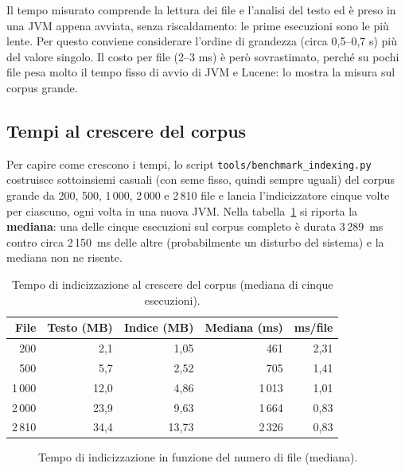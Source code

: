 \documentclass[11pt,a4paper]{article}
\newcommand{\code}[1]{\texttt{#1}}
\begin{document}
\noindent Il tempo misurato comprende la lettura dei file e l'analisi del testo
ed è preso in una JVM appena avviata, senza riscaldamento: le prime esecuzioni
sono le più lente. Per questo conviene considerare l'ordine di grandezza
(circa 0,5--0,7 s) più del valore singolo. Il costo per file (2--3 ms) è però
sovrastimato, perché su pochi file pesa molto il tempo fisso di avvio di JVM e Lucene:
lo mostra la misura sul corpus grande.

\subsection{Tempi al crescere del corpus}
\label{sec:tempi-grande}

Per capire come crescono i tempi, lo script \code{tools/benchmark\_indexing.py} costruisce
sottoinsiemi casuali (con seme fisso, quindi sempre uguali) del corpus grande da 200,
500, 1\,000, 2\,000 e 2\,810 file e lancia l'indicizzatore cinque volte per ciascuno,
ogni volta in una nuova JVM. Nella tabella~\ref{tab:scala} si riporta la
\textbf{mediana}: una delle cinque esecuzioni sul corpus completo è durata 3\,289~ms
contro circa 2\,150~ms delle altre (probabilmente un disturbo del sistema) e la
mediana non ne risente.

\begin{table}[!htbp]
\centering
\begin{tabular}{@{}rrrrr@{}}
\toprule
\textbf{File} & \textbf{Testo (MB)} & \textbf{Indice (MB)} & \textbf{Mediana (ms)} & \textbf{ms/file} \\
\midrule
200   & 2,1  & 1,05  &  461 & 2,31 \\
500   & 5,7  & 2,52  &  705 & 1,41 \\
1\,000 & 12,0 & 4,86  & 1\,013 & 1,01 \\
2\,000 & 23,9 & 9,63  & 1\,664 & 0,83 \\
2\,810 & 34,4 & 13,73 & 2\,326 & 0,83 \\
\bottomrule
\end{tabular}
\caption{Tempo di indicizzazione al crescere del corpus (mediana di cinque esecuzioni).}
\label{tab:scala}
\end{table}

\begin{figure}[!htbp]
\centering
{}
\caption{Tempo di indicizzazione in funzione del numero di file (mediana).}
\label{fig:scala}
\end{figure}
\end{document}
